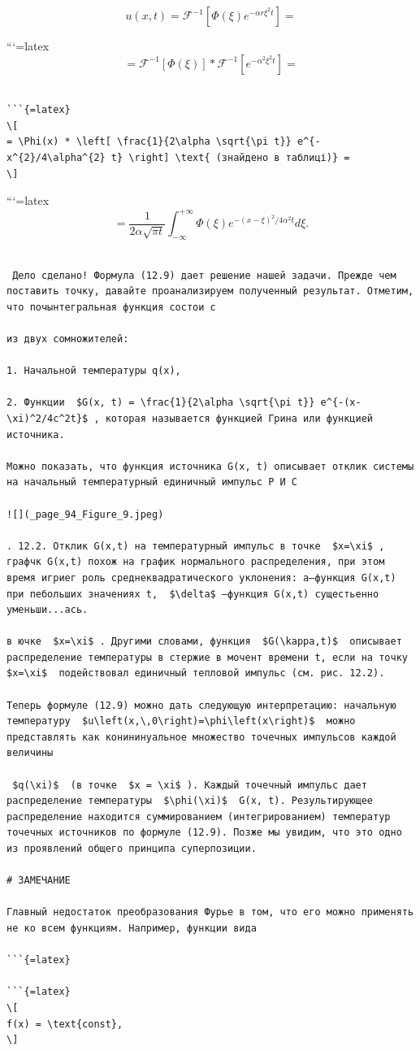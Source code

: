 \documentclass[
  ukrainian,
]{article}
\begin{document}
\[
u(x, t) = \mathcal{F}^{-1} \left[ \Phi(\xi) e^{-\alpha r \xi^{2} t} \right] =
\]

```{=latex}
\[
= \mathcal{F}^{-1} \left[ \Phi(\xi) \right] * \mathcal{F}^{-1} \left[ e^{-\alpha^{2} \xi^{2} t} \right] =
\]

\begin{verbatim}

```{=latex}
\[
= \Phi(x) * \left[ \frac{1}{2\alpha \sqrt{\pi t}} e^{-x^{2}/4\alpha^{2} t} \right] \text{ (знайдено в таблиці)} =
\]
\end{verbatim}

```{=latex}
\[
= \frac{1}{2\alpha \sqrt{\pi t}} \int_{-\infty}^{+\infty} \Phi(\xi) e^{-(x-\xi)^{2}/4\alpha^{2} t} d\xi.
\]

\begin{verbatim}

 Дело сделано! Формула (12.9) дает решение нашей задачи. Прежде чем поставить точку, давайте проанализируем полученный результат. Отметим, что почынтегральная функция состои с

из двух сомножителей:

1. Начальной температуры q(x),

2. Функции  $G(x, t) = \frac{1}{2\alpha \sqrt{\pi t}} e^{-(x-\xi)^2/4c^2t}$ , которая называется функцией Грина или функцией источника.

Можно показать, что функция источника G(x, t) описывает отклик системы на начальный температурный единичный импульс Р И С

![](_page_94_Figure_9.jpeg)

. 12.2. Отклик G(x,t) на температурный импульс в точке  $x=\xi$ , графчк G(x,t) похож на график нормального распределения, при этом время игриег роль среднеквадратического уклонения: a—функция G(x,t) при пебольших значениях t,  $\delta$ —функция G(x,t) сущестьенно уменьши...ась.

в ючке  $x=\xi$ . Другими словами, функция  $G(\kappa,t)$  описывает распределение температуры в стержие в мочент времени t, если на точку  $x=\xi$  подействовал единичный тепловой импульс (см. рис. 12.2).

Теперь формуле (12.9) можно дать следующую интерпретацию: начальную температуру  $u\left(x,\,0\right)=\phi\left(x\right)$  можно представлять как конининуальное множество точечных импульсов каждой величины

 $q(\xi)$  (в точке  $x = \xi$ ). Каждый точечный импульс дает распределение температуры  $\phi(\xi)$  G(x, t). Результирующее распределение находится суммированием (интегрированием) температур точечных источников по формуле (12.9). Позже мы увидим, что это одно из проявлений общего принципа суперпозиции.

# ЗАМЕЧАНИЕ

Главный недостаток преобразования Фурье в том, что его можно применять не ко всем функциям. Например, функции вида

```{=latex}

```{=latex}
\[
f(x) = \text{const},
\]
\end{verbatim}
\end{document}
